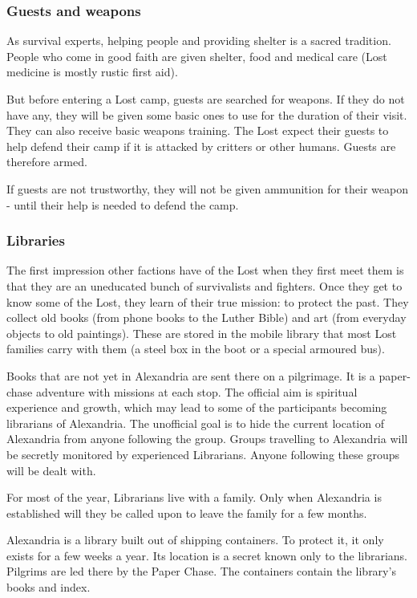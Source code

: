 \subsubsection{Guests and weapons}
\label{sec:Lost guests and weapons}
As survival experts, helping people and providing shelter is a sacred tradition. People who come in good faith are given shelter, food and medical care (Lost medicine is mostly rustic first aid).

But before entering a Lost camp, guests are searched for weapons. If they do not have any, they will be given some basic ones to use for the duration of their visit. They can also receive basic weapons training. The Lost expect their guests to help defend their camp if it is attacked by critters or other humans. Guests are therefore armed.

If guests are not trustworthy, they will not be given ammunition for their weapon - until their help is needed to defend the camp.

\subsubsection{Libraries}

The first impression other factions have of the Lost when they first meet them is that they are an uneducated bunch of survivalists and fighters. Once they get to know some of the Lost, they learn of their true mission: to protect the past. They collect old books (from phone books to the Luther Bible) and art (from everyday objects to old paintings).
These are stored in the mobile library that most Lost families carry with them (a steel box in the boot or a special armoured bus).

Books that are not yet in Alexandria are sent there on a pilgrimage. It is a paper-chase adventure with missions at each stop. The official aim is spiritual experience and growth, which may lead to some of the participants becoming librarians of Alexandria. The unofficial goal is to hide the current location of Alexandria from anyone following the group.
Groups travelling to Alexandria will be secretly monitored by experienced Librarians. Anyone following these groups will be dealt with.

For most of the year, Librarians live with a family. Only when Alexandria is established will they be called upon to leave the family for a few months.

Alexandria is a library built out of shipping containers. To protect it, it only exists for a few weeks a year. Its location is a secret known only to the librarians. Pilgrims are led there by the Paper Chase. The containers contain the library's books and index.

